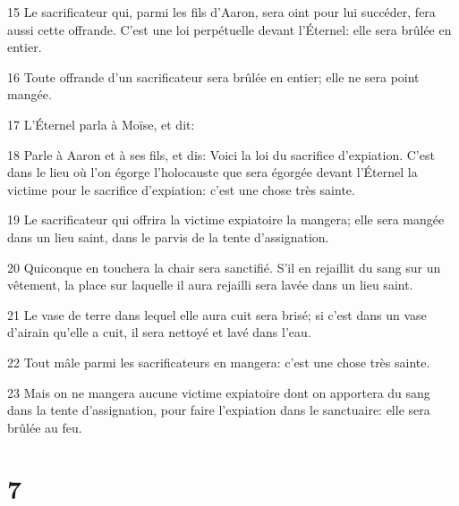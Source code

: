 \par 15 Le sacrificateur qui, parmi les fils d'Aaron, sera oint pour lui succéder, fera aussi cette offrande. C'est une loi perpétuelle devant l'Éternel: elle sera brûlée en entier.
\par 16 Toute offrande d'un sacrificateur sera brûlée en entier; elle ne sera point mangée.
\par 17 L'Éternel parla à Moïse, et dit:
\par 18 Parle à Aaron et à ses fils, et dis: Voici la loi du sacrifice d'expiation. C'est dans le lieu où l'on égorge l'holocauste que sera égorgée devant l'Éternel la victime pour le sacrifice d'expiation: c'est une chose très sainte.
\par 19 Le sacrificateur qui offrira la victime expiatoire la mangera; elle sera mangée dans un lieu saint, dans le parvis de la tente d'assignation.
\par 20 Quiconque en touchera la chair sera sanctifié. S'il en rejaillit du sang sur un vêtement, la place sur laquelle il aura rejailli sera lavée dans un lieu saint.
\par 21 Le vase de terre dans lequel elle aura cuit sera brisé; si c'est dans un vase d'airain qu'elle a cuit, il sera nettoyé et lavé dans l'eau.
\par 22 Tout mâle parmi les sacrificateurs en mangera: c'est une chose très sainte.
\par 23 Mais on ne mangera aucune victime expiatoire dont on apportera du sang dans la tente d'assignation, pour faire l'expiation dans le sanctuaire: elle sera brûlée au feu.

\chapter{7}

